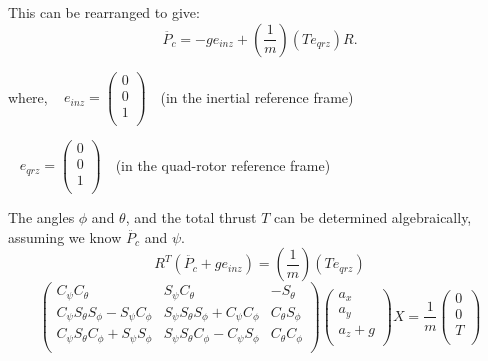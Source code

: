 This can be rearranged to give:
\begin{equation}
    \label{eq:acc_from_model}
    \ddot{P_c} = - g e_{inz} + \left(\frac{1}{m}\right) \left(T e_{qrz}\right) R .
\end{equation}

where,
\mbox{ } \hspace{.5in} $ e_{inz} = \left( \begin{array}{c}
0\\0\\1\\
\end{array}\right) \text{  }$ (in the inertial reference frame)

\mbox{ } \hspace{1in} $ e_{qrz} = \left( \begin{array}{c}
0\\0\\1\\
\end{array}\right) \text{  }$  (in the quad-rotor reference frame)

The angles $\phi$ and $\theta$, and the total thrust $T$ can be determined algebraically, assuming we know $\ddot{P_c}$ and $\psi$.\\

\begin{equation}
    \label{eq:thrustTransformation}
    R^T \left( \ddot{P_c} + g e_{inz}\right) = \left(\frac{1}{m}\right) \left(T e_{qrz}\right)
\end{equation}
\begin{equation}
    \left( \begin{array}{ccc}
        C_{\psi} C_{\theta} & S_{\psi} C_{\theta} & -S_{\theta}\\
        C_{\psi} S_{\theta} S_{\phi} - S_{\psi} C_{\phi} & S_{\psi} S_{\theta} S_{\phi} + C_{\psi} C_{\phi} & C_{\theta} S_{\phi}\\
        C_{\psi} S_{\theta} C_{\phi} + S_{\psi} S_{\phi} & S_{\psi} S_{\theta} C_{\phi} - C_{\psi} S_{\phi} & C_{\theta} C_{\phi}\\
    \end{array} \right)\left( \begin{array}{c} a_x\\a_y\\a_z+g\\\end{array} \right)X
    = \frac{1}{m} \left( \begin{array}{c} 0\\0\\T\\ \end{array} \right)
\end{equation}

